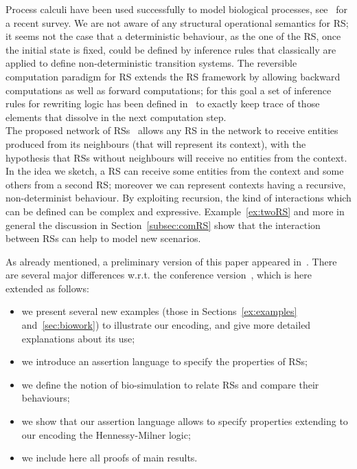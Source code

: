 Process calculi have been used successfully to model
biological processes, see~\cite{BBDFH18} for a recent survey.
We are not aware of any 
structural operational semantics for RS; it seems not the case
that a deterministic behaviour, as the one of the RS, once the initial state is 
fixed, could be defined by inference rules that classically are applied 
to define non-deterministic transition systems.
The reversible computation paradigm for RS extends the RS framework  by
allowing  backward computations as well as forward computations; for this 
goal a set of inference rules for rewriting logic has been 
defined in~\cite{10.1007/978-3-319-73359-3_3}
to exactly keep trace of those elements that  dissolve in the next 
computation step.\\
%
The proposed network of RSs~\cite{BLR20} allows
any RS in the network to receive entities 
produced from its neighbours (that will represent its context), with the hypothesis that  
RSs without neighbours will receive no entities 
from the context. 
In the idea we sketch, a RS can receive some entities from the context and some others from a second RS; moreover we can represent contexts having a recursive, non-determinist behaviour.
%
By exploiting recursion, the kind of interactions which can be 
defined can be complex and expressive.
Example~\ref{ex:twoRS} and more in general the discussion in 
Section~\ref{subsec:comRS}
 show that 
the interaction between RSs can help to model new scenarios.



As already mentioned, a preliminary version of this paper appeared in~\cite{BBF19}.
There are several major differences w.r.t. the conference version~\cite{BBF19}, which is here extended as follows:
\begin{itemize}
\item we present several new examples (those in Sections~\ref{ex:examples} and~\ref{sec:biowork}) to illustrate our 
 encoding,
and give more detailed explanations about its use;
\item we introduce an assertion language to specify the properties of RSs;
\item we define the notion of bio-simulation to relate RSs
and compare their behaviours;
\item we show that our assertion language allows to specify properties extending to our
encoding
the Hennessy-Milner logic;
\item we include here all proofs of main results.
\end{itemize}
 
